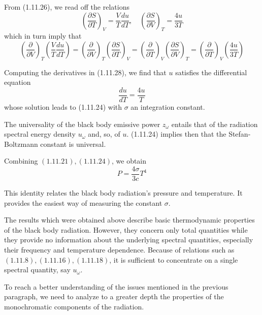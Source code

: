 \documentclass{article}
\begin{document}
From (1.11.26), we read off the relations
$$
\begin{equation*}
\left(\frac{\partial S}{\partial T}\right)_{V}=\frac{V}{T} \frac{d u}{d T}, \quad\left(\frac{\partial S}{\partial V}\right)_{T}=\frac{4 u}{3 T} \tag{1.11.27}
\end{equation*}
$$
which in turn imply that
$$
\begin{equation*}
\left(\frac{\partial}{\partial V}\right)_{T}\left(\frac{V}{T} \frac{d u}{d T}\right)=\left(\frac{\partial}{\partial V}\right)_{T}\left(\frac{\partial S}{\partial T}\right)_{V}=\left(\frac{\partial}{\partial T}\right)_{V}\left(\frac{\partial S}{\partial V}\right)_{T}=\left(\frac{\partial}{\partial T}\right)_{V}\left(\frac{4 u}{3 T}\right) \tag{1.11.28}
\end{equation*}
$$

Computing the derivatives in (1.11.28), we find that $u$ satisfies the differential equation
$$
\begin{equation*}
\frac{d u}{d T}=\frac{4 u}{T} \tag{1.11.29}
\end{equation*}
$$
whose solution leads to (1.11.24) with $\sigma$ an integration constant.

The universality of the black body emissive power $z_{\omega}$ entails that of the radiation spectral energy density $u_{\omega}$ and, so, of $u$. (1.11.24) implies then that the Stefan-Boltzmann constant is universal.

Combining $(1.11 .21),(1.11 .24)$, we obtain
$$
\begin{equation*}
P=\frac{4 \sigma}{3 c} T^{4} \tag{1.11.30}
\end{equation*}
$$

This identity relates the black body radiation's pressure and temperature. It provides the easiest way of measuring the constant $\sigma$.

The results which were obtained above describe basic thermodynamic properties of the black body radiation. However, they concern only total quantities while they provide no information about the underlying spectral quantities, especially their frequency and temperature dependence. Because of relations such as $(1.11 .8),(1.11 .16),(1.11 .18)$, it is sufficient to concentrate on a single spectral quantity, say $u_{\omega}$.

To reach a better understanding of the issues mentioned in the previous paragraph, we need to analyze to a greater depth the properties of the monochromatic components of the radiation.
\end{document}
